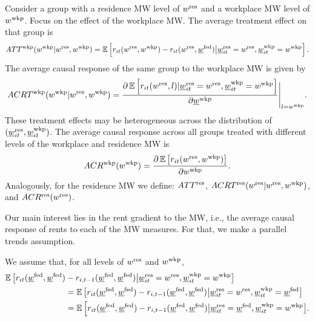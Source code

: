 \begin{definition}\label{def:treatment_effects}
    Consider a group with a residence MW level of $w^{\text{res}}$ and a workplace
    MW level of $w^{\text{wkp}}$.
    Focus on the effect of the workplace MW.
    The average treatment effect on that group is
    \begin{equation*}
        ATT^{\text{wkp}}(w^{\text{wkp}} | w^{\text{res}}, w^{\text{wkp}}) 
            = \operatorname{\mathbb{E}}\left[r_{it}(w^{\text{res}}, w^{\text{wkp}}) - r_{it}(w^{\text{res}}, \underline{w}^{\text{fed}}) 
                    \big| \underline{w}_{it}^{\text{res}}=w^{\text{res}}, \underline{w}_{it}^{\text{wkp}}=w^{\text{wkp}}\right] .
    \end{equation*}
    The average causal response of the same group to the workplace MW is given by
    \begin{equation*}
        ACRT^{\text{wkp}}(w^{\text{wkp}} | w^{\text{res}}, w^{\text{wkp}}) 
            = \frac{\partial \operatorname{\mathbb{E}}\left[r_{it}(w^{\text{res}}, l) | \underline{w}_{it}^{\text{res}}=w^{\text{res}}, \underline{w}_{it}^{\text{wkp}}=w^{\text{wkp}}\right]}
                    {\partial \underline{w}^{\text{wkp}}} \Bigg|_{l=w^{\text{wkp}}} .
    \end{equation*}
    These treatment effects may be heterogeneous across the distribution 
    of $(\underline{w}_{it}^{\text{res}},\underline{w}_{it}^{\text{wkp}})$.
    The average causal response across all groups treated with different 
    levels of the workplace and residence MW is
    \begin{equation*}
        ACR^{\text{wkp}}(w^{\text{wkp}}) = \frac{\partial \operatorname{\mathbb{E}}\left[r_{it}(w^{\text{res}}, w^{\text{wkp}}) \right] }
                                    {\partial w^{\text{wkp}}} .
    \end{equation*}
    Analogously, for the residence MW we define: $ATT^{\text{res}}$, 
    $ACRT^{\text{res}}(w^{\text{res}} | w^{\text{res}}, w^{\text{wkp}})$, and $ACR^{\text{res}}(w^{\text{res}})$.
\end{definition}

Our main interest lies in the rent gradient to the MW, i.e., the 
average causal response of rents to each of the MW measures.
For that, we make a parallel trends assumption.

\begin{assu} \label{assu:PT}
    We assume that, for all levels of $w^{\text{res}}$ and $w^{\text{wkp}}$,
    \begin{align*}\label{eq:PT}
        \operatorname{\mathbb{E}}\big[r_{it}(\underline{w}^{\text{fed}}, \underline{w}^{\text{fed}}) & - r_{i,t-1}(\underline{w}^{\text{fed}}, \underline{w}^{\text{fed}}) 
                \big| \underline{w}_{it}^{\text{res}}=w^{\text{res}}, \underline{w}_{it}^{\text{wkp}}=w^{\text{wkp}} \big] \\
        & = \operatorname{\mathbb{E}}\big[r_{it}(\underline{w}^{\text{fed}}, \underline{w}^{\text{fed}}) - r_{i,t-1}(\underline{w}^{\text{fed}}, \underline{w}^{\text{fed}})
                \big| \underline{w}_{it}^{\text{res}}=w^{\text{res}}, \underline{w}_{it}^{\text{wkp}}=\underline{w}^{\text{fed}} \big] \\
        & = \operatorname{\mathbb{E}}\Big[r_{it}(\underline{w}^{\text{fed}}, \underline{w}^{\text{fed}}) - r_{i,t-1}(\underline{w}^{\text{fed}}, \underline{w}^{\text{fed}})
                \big| \underline{w}_{it}^{\text{res}}=\underline{w}^{\text{fed}}, \underline{w}_{it}^{\text{wkp}}=w^{\text{wkp}} \big] .
    \end{align*}
\end{assu}

